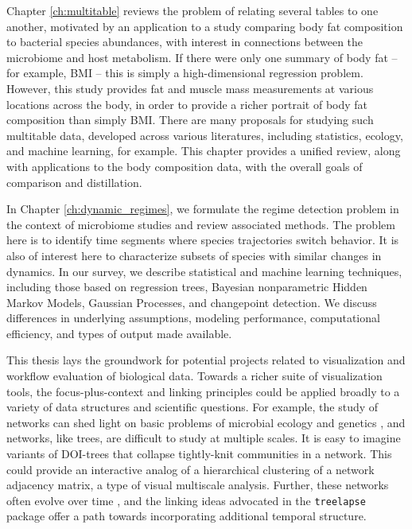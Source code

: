 Chapter \ref{ch:multitable} reviews the problem of relating several tables to
one another, motivated by an application to a study comparing body fat
composition to bacterial species abundances, with interest in connections
between the microbiome and host metabolism. If there were only one summary of
body fat -- for example, BMI -- this is simply a high-dimensional regression
problem. However, this study provides fat and muscle mass measurements at
various locations across the body, in order to provide a richer portrait of body
fat composition than simply BMI. There are many proposals for studying such
multitable data, developed across various literatures, including statistics,
ecology, and machine learning, for example. This chapter provides a unified
review, along with applications to the body composition data, with the overall
goals of comparison and distillation.

In Chapter \ref{ch:dynamic_regimes}, we formulate the regime detection problem
in the context of microbiome studies and review associated methods. The problem
here is to identify time segments where species trajectories switch behavior. It
is also of interest here to characterize subsets of species with similar changes
in dynamics. In our survey, we describe statistical and machine learning
techniques, including those based on regression trees, Bayesian nonparametric
Hidden Markov Models, Gaussian Processes, and changepoint detection. We discuss
differences in underlying assumptions, modeling performance, computational
efficiency, and types of output made available.

This thesis lays the groundwork for potential projects related to visualization
and workflow evaluation of biological data. Towards a richer suite of
visualization tools, the focus-plus-context and linking principles could be
applied broadly to a variety of data structures and scientific questions. For
example, the study of networks can shed light on basic problems of microbial
ecology and genetics \citep{akutsu2000inferring, coyte2015ecology}, and
networks, like trees, are difficult to study at multiple scales. It is easy to
imagine variants of DOI-trees that collapse tightly-knit communities in a
network. This could provide an interactive analog of a hierarchical clustering
of a network adjacency matrix, a type of visual multiscale analysis. Further,
these networks often evolve over time \citep{kolar2010estimating}, and the
linking ideas advocated in the \texttt{treelapse} package offer a path towards
incorporating additional temporal structure.

